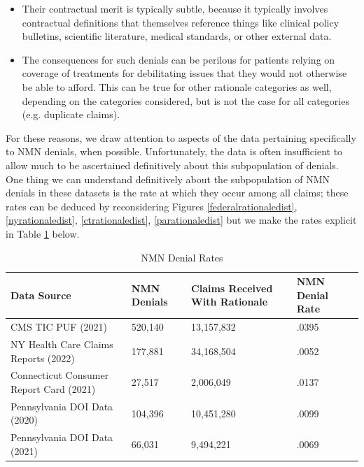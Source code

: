 \documentclass[12pt, a4paper,twoside,parskip=full]{report}
\theoremstyle{plain} %
\theoremstyle{definition} %
\theoremstyle{remark} %
\numberwithin{equation}{chapter}
\begin{document}
		\begin{itemize}
			\item Their contractual merit is typically subtle, because it typically involves contractual definitions that themselves reference things like clinical policy bulletins, scientific literature, medical standards, or other external data.
			\item The consequences for such denials can be perilous for patients relying on coverage of treatments for debilitating issues that they would not otherwise be able to afford. This can be true for other rationale categories as well, depending on the categories considered, but is not the case for all categories (e.g. duplicate claims).
		\end{itemize}
	
		For these reasons, we draw attention to aspects of the data pertaining specifically to NMN denials, when possible. Unfortunately, the data is often insufficient to allow much to be ascertained definitively about this subpopulation of denials.\\
		
		One thing we can understand definitively about the subpopulation of NMN denials in these datasets is the rate at which they occur among all claims; these rates can be deduced by reconsidering Figures \ref{federalrationaledist}, \ref{nyrationaledist}, \ref{ctrationaledist}, \ref{parationaledist} but we make the rates explicit in Table  \ref{nmndenialratetable} below.\\
		
		\begin{table}[!ht]
			\centering
			\begin{tabular}{|p{5cm}|p{3cm}|p{4cm}|p{3cm}|}
				\hline
				\textbf{Data Source} & \textbf{NMN Denials} & \textbf{Claims Received \newline With Rationale} & \textbf{NMN Denial \newline Rate}  \\ \hline
				CMS TIC PUF (2021) & 520,140 & 13,157,832 & .0395 \\ \hline
				NY Health Care Claims Reports (2022) & 177,881 & 34,168,504 & 	.0052 \\ \hline
				Connecticut Consumer Report Card (2021) & 27,517 & 2,006,049 &  .0137 \\ \hline
				Pennsylvania DOI Data (2020) & 104,396 & 10,451,280 &  .0099 \\ \hline
				Pennsylvania DOI Data (2021) & 66,031 & 	9,494,221 &  	.0069 \\ \hline
			\end{tabular}
			\caption{NMN Denial Rates}
			\label{nmndenialratetable}
		\end{table}
		
\end{document}
